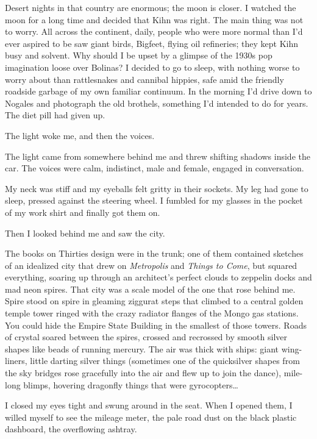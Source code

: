 Desert nights in that country are enormous; the moon is closer. I watched the moon for a long time and decided that Kihn was right. The main thing was not to worry. All across the continent, daily, people who were more normal than I'd ever aspired to be saw giant birds, Bigfeet, flying oil refineries; they kept Kihn busy and solvent. Why should I be upset by a glimpse of the 1930s pop imagination loose over Bolinas? I decided to go to sleep, with nothing worse to worry about than rattlesnakes and cannibal hippies, safe amid the friendly roadside garbage of my own familiar continuum. In the morning I'd drive down to Nogales and photograph the old brothels, something I'd intended to do for years. The diet pill had given up.

The light woke me, and then the voices.

The light came from somewhere behind me and threw shifting shadows inside the car. The voices were calm, indistinct, male and female, engaged in conversation.

My neck was stiff and my eyeballs felt gritty in their sockets. My leg had gone to sleep, pressed against the steering wheel. I fumbled for my glasses in the pocket of my work shirt and finally got them on.

Then I looked behind me and saw the city.

The books on Thirties design were in the trunk; one of them contained sketches of an idealized city that drew on \textit{Metropolis} and \textit{Things to Come}, but squared everything, soaring up through an architect's perfect clouds to zeppelin docks and mad neon spires. That city was a scale model of the one that rose behind me. Spire stood on spire in gleaming ziggurat steps that climbed to a central golden temple tower ringed with the crazy radiator flanges of the Mongo gas stations. You could hide the Empire State Building in the smallest of those towers. Roads of crystal soared between the spires, crossed and recrossed by smooth silver shapes like beads of running mercury. The air was thick with ships: giant wing-liners, little darting silver things (sometimes one of the quicksilver shapes from the sky bridges rose gracefully into the air and flew up to join the dance), mile-long blimps, hovering dragonfly things that were gyrocopters\ldots

I closed my eyes tight and swung around in the seat. When I opened them, I willed myself to see the mileage meter, the pale road dust on the black plastic dashboard, the overflowing ashtray.

